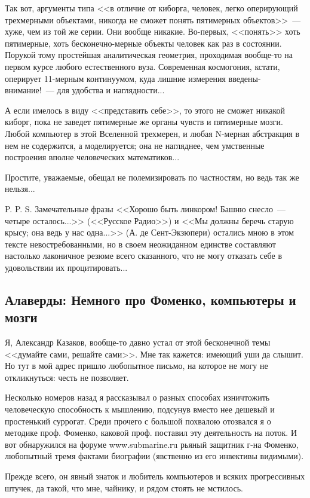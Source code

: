 \documentclass{scrbook}
\newcommand{\flqq}{<<}
\newcommand{\frqq}{>>}
\newcommand{\mdash}{~--- }
\newcommand{\essaysection}[1]{\subsection*{#1}\nopagebreak}
\begin{document}
Так вот, аргументы типа {\flqq}в отличие от киборга, человек, легко оперирующий трехмерными объектами, никогда не сможет понять пятимерных объектов{\frqq}{\mdash}хуже, чем из той же серии. Они вообще никакие. Во-первых, {\flqq}понять{\frqq} хоть пятимерные, хоть бесконечно-мерные объекты человек как раз в состоянии. Порукой тому простейшая аналитическая геометрия, проходимая вообще-то на первом курсе любого естественного вуза. Современная космогония, кстати, оперирует 11-мерным континуумом, куда лишние измерения введены-внимание!{\mdash}для удобства и наглядности...

А если имелось в виду {\flqq}представить себе{\frqq}, то этого не сможет никакой киборг, пока не заведет пятимерные же органы чувств и пятимерные мозги. Любой компьютер в этой Вселенной трехмерен, и любая N-мерная абстракция в нем не содержится, а моделируется; она не нагляднее, чем умственные построения вполне человеческих математиков...

Простите, уважаемые, обещал не полемизировать по частностям, но ведь так же нельзя...

P. P. S. Замечательные фразы {\flqq}Хорошо быть линкором! Башню снесло{\mdash}четыре осталось...{\frqq} ({\flqq}Русское Радио{\frqq}) и {\flqq}Мы должны беречь старую крысу; она ведь у нас одна...{\frqq} (А. де Сент-Экзюпери) остались мною в этом тексте невостребованными, но в своем неожиданном единстве составляют настолько лаконичное резюме всего сказанного, что не могу отказать себе в удовольствии их процитировать...

\essaysection{Алаверды: Немного про Фоменко, компьютеры и мозги}

Я, Александр Казаков, вообще-то давно устал от этой бесконечной темы {\flqq}думайте сами, решайте сами{\frqq}. Мне так кажется: имеющий уши да слышит. Но тут в мой адрес пришло любопытное письмо, на которое не могу не откликнуться: честь не позволяет.

Несколько номеров назад я рассказывал о разных способах изничтожить человеческую способность к мышлению, подсунув вместо нее дешевый и простенький суррогат. Среди прочего с большой похвалою отозвался я о методике проф. Фоменко, каковой проф. поставил эту деятельность на поток. И вот обнаружился на форуме www.submarine.ru рьяный защитник г-на Фоменко, любопытный тремя фактами биографии (явственно из его инвективы видимыми).

Прежде всего, он явный знаток и любитель компьютеров и всяких прогрессивных штучек, да такой, что мне, чайнику, и рядом стоять не мстилось. 
\end{document}
